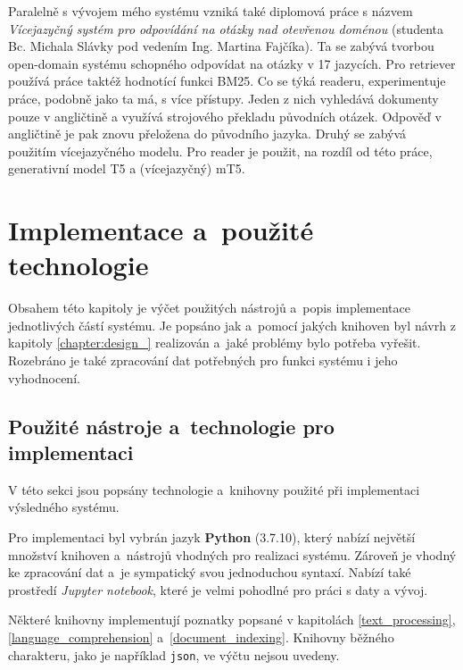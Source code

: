 Paralelně s vývojem mého systému vzniká také diplomová práce s názvem \textit{Vícejazyčný systém pro odpovídání na otázky nad otevřenou doménou} (studenta Bc. Michala Slávky pod vedením Ing. Martina Fajčíka). Ta se zabývá tvorbou open-domain systému schopného odpovídat na otázky v 17 jazycích. Pro retriever používá práce taktéž hodnotící funkci BM25. Co se týká readeru, experimentuje práce, podobně jako ta má, s více přístupy. Jeden z nich vyhledává dokumenty pouze v angličtině a využívá strojového překladu původních otázek. Odpověď v angličtině je pak znovu přeložena do původního jazyka. Druhý se zabývá použitím vícejazyčného modelu. Pro reader je použit, na rozdíl od této práce, generativní model T5 a (vícejazyčný) mT5.

\chapter{Implementace a~použité technologie}
\label{chapter:implementace}
Obsahem této kapitoly je výčet použitých nástrojů a~popis implementace jednotlivých částí systému. Je popsáno jak a~pomocí jakých knihoven byl návrh z kapitoly \ref{chapter:design_} realizován a~jaké problémy bylo potřeba vyřešit. Rozebráno je také zpracování dat potřebných pro funkci systému i jeho vyhodnocení.

\section{Použité nástroje a~technologie pro implementaci}
\label{pouzite_nastroje}
V této sekci jsou popsány technologie a~knihovny použité při implementaci výsledného systému.\par
Pro implementaci byl vybrán jazyk \textbf{Python} (3.7.10), který nabízí největší množství knihoven a~nástrojů vhodných pro realizaci systému. Zároveň je vhodný ke zpracování dat a~je sympatický svou jednoduchou syntaxí. Nabízí také prostředí \emph{Jupyter notebook}, které je velmi pohodlné pro práci s daty a vývoj.\par
Některé knihovny implementují poznatky popsané v kapitolách \ref{text_processing}, \ref{language_comprehension} a~\ref{document_indexing}. Knihovny běžného charakteru, jako je například \texttt{json}, ve výčtu nejsou uvedeny.

